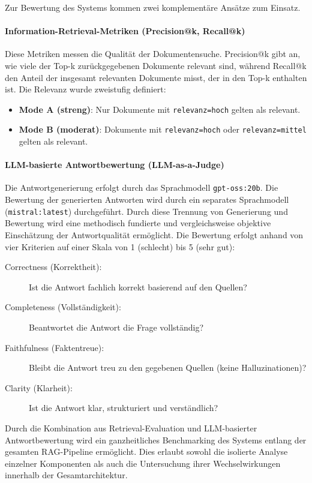 \documentclass[12pt,a4paper]{scrreprt}
\begin{document}
Zur Bewertung des Systems kommen zwei komplementäre Ansätze zum Einsatz.

\paragraph{Information-Retrieval-Metriken (Precision@k, Recall@k)}
Diese Metriken messen die Qualität der Dokumentensuche. Precision@k gibt an, wie viele der Top-k zurückgegebenen Dokumente relevant sind, während Recall@k den Anteil der insgesamt relevanten Dokumente misst, der in den Top-k enthalten ist. Die Relevanz wurde zweistufig definiert:

\begin{itemize}
  \item \textbf{Mode A (streng)}: Nur Dokumente mit \texttt{relevanz=hoch} gelten als relevant.
  \item \textbf{Mode B (moderat)}: Dokumente mit \texttt{relevanz=hoch} oder \texttt{relevanz=mittel} gelten als relevant.
\end{itemize}

\paragraph{LLM-basierte Antwortbewertung (LLM-as-a-Judge)}
Die Antwortgenerierung erfolgt durch das Sprachmodell \texttt{gpt-oss:20b}. Die Bewertung der generierten Antworten wird durch ein separates Sprachmodell (\texttt{mistral:latest}) durchgeführt. Durch diese Trennung von Generierung und Bewertung wird eine methodisch fundierte und vergleichsweise objektive Einschätzung der Antwortqualität ermöglicht. Die Bewertung erfolgt anhand von vier Kriterien auf einer Skala von 1 (schlecht) bis 5 (sehr gut):

\begin{description}
  \item[Correctness (Korrektheit):] Ist die Antwort fachlich korrekt basierend auf den Quellen?
  \item[Completeness (Vollständigkeit):] Beantwortet die Antwort die Frage vollständig?
  \item[Faithfulness (Faktentreue):] Bleibt die Antwort treu zu den gegebenen Quellen (keine Halluzinationen)?
  \item[Clarity (Klarheit):] Ist die Antwort klar, strukturiert und verständlich?
\end{description}

Durch die Kombination aus Retrieval-Evaluation und LLM-basierter Antwortbewertung wird ein ganzheitliches Benchmarking des Systems entlang der gesamten RAG-Pipeline ermöglicht. Dies erlaubt sowohl die isolierte Analyse einzelner Komponenten als auch die Untersuchung ihrer Wechselwirkungen innerhalb der Gesamtarchitektur.
\end{document}
